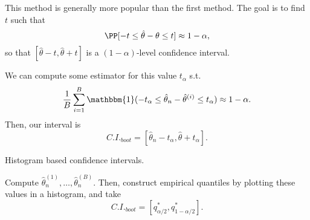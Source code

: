 This method is generally more popular than the first method. The goal is to find $t$ such that 
\[\PP[-t\leq \hat{\theta}-\theta \leq t]\approx 1-\alpha,\]
so that $[\hat{\theta}-t, \hat{\theta}+t]$ is a $(1-\alpha)$-level confidence interval. 

We can compute some estimator for this value $t_{\alpha}$ s.t.
\[\frac{1}{B}\sum_{i=1}^B \mathbbm{1}(-t_{\alpha}\leq \hat{\theta}_n-\hat{\theta}^{(i)}\leq t_{\alpha})\approx 1-\alpha.\]
Then, our interval is 
\[C.I._{boot} = [\hat{\theta}_n - t_{\alpha}, \hat{\theta}+t_{\alpha}].\]

\begin{example}
\exlabel

Histogram based confidence intervals. 
\end{example}

Compute $\hat{\theta}_n^{(1)}, \hdots, \hat{\theta}_n^{(B)}$. Then, construct empirical quantiles by plotting these values in a histogram, and take 
\[C.I._{boot} = [q_{\alpha/2}^*, q_{1-\alpha/2}^*].\]